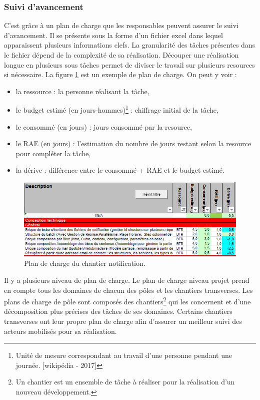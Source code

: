 \documentclass[12pt,a4paper]{article}
\begin{document}
\subsubsection{Suivi d’avancement}
C'est grâce à un plan de charge que les responsables peuvent assurer le suivi d'avancement. Il se présente sous la forme d'un fichier excel dans lequel apparaissent plusieurs informations clefs. La granularité des tâches présentes dans le fichier dépend de la complexité de sa réalisation. Découper une réalisation longue en plusieurs sous tâches permet de diviser le travail sur plusieurs resources si nécessaire. La figure \ref{pdc} est un exemple de plan de charge.
\newpage
On peut  y voir :
\begin{itemize}
\item la ressource : la personne réalisant la tâche,
\item le budget estimé (en jours-hommes)\footnote{Unité de mesure correspondant au travail d’une personne pendant une journée. [wikipédia - 2017]} : chiffrage initial de la tâche,
\item le consommé (en jours) : jours consommé par la resource,
\item le \gls{RAE} (en jours) : l'estimation du nombre de jours restant selon la resource pour compléter la tâche,
\item la dérive : différence entre le consommé + \gls{RAE} et le budget estimé.
\end{itemize}
\begin{figure}[H]
	\begin{center}
		\includegraphics[width=\textwidth,height=\textheight,keepaspectratio]{planDeCharge.png}
		\caption{Plan de charge du chantier notification.}
		\label{pdc}
	\end{center}
\end{figure}
Il y a plusieurs niveau de plan de charge. Le plan de charge niveau projet prend en compte tous les domaines de chacun des pôles et les chantiers transverses. Les plans de charge de pôle sont composés des chantiers\footnote{Un chantier est un ensemble de tâche à réaliser pour la réalisation d'un nouveau développement.} qui les concernent et d'une décomposition plus précises des tâches de ses domaines. Certains chantiers transverses ont leur propre plan de charge afin d'assurer un meilleur suivi des acteurs mobilisés pour sa réalisation.
\end{document}
